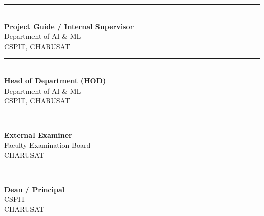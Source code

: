 \documentclass[11pt,a4paper]{article}
\begin{document}
\vspace{1.4cm}
\noindent
\begin{minipage}[t]{0.46\textwidth}
  \rule{\linewidth}{0.6pt}\\
  \textbf{Project Guide / Internal Supervisor}\\
  Department of AI \& ML\\
  CSPIT, CHARUSAT
\end{minipage}
\hfill
\begin{minipage}[t]{0.46\textwidth}
  \rule{\linewidth}{0.6pt}\\
  \textbf{Head of Department (HOD)}\\
  Department of AI \& ML\\
  CSPIT, CHARUSAT
\end{minipage}

\vspace{1.4cm}
\noindent
\begin{minipage}[t]{0.46\textwidth}
  \rule{\linewidth}{0.6pt}\\
  \textbf{External Examiner}\\
  Faculty Examination Board\\
  CHARUSAT
\end{minipage}
\hfill
\begin{minipage}[t]{0.46\textwidth}
  \rule{\linewidth}{0.6pt}\\
  \textbf{Dean / Principal}\\
  CSPIT\\
  CHARUSAT
\end{minipage}
\end{document}
